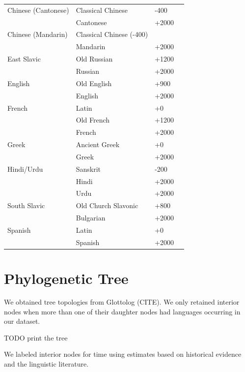 \documentclass[11pt,a4paper]{article}
\begin{document}
\begin{tabular}{llll} \hline
Chinese (Cantonese) & Classical Chinese & -400  \\
& Cantonese & +2000\\ \hline
Chinese (Mandarin) & Classical Chinese (-400)  \\
& Mandarin & +2000 \\ \hline
East Slavic & Old Russian & +1200 \\
& Russian & +2000 \\ \hline
English & Old English & +900 \\
& English  & +2000\\ \hline
French & Latin &+0  \\
& Old French &+1200\\
& French  & +2000\\ \hline
Greek & Ancient Greek & +0 \\
& Greek  & +2000\\ \hline
Hindi/Urdu & Sanskrit & -200 \\
& Hindi  & +2000\\
& Urdu  & +2000\\ \hline
South Slavic & Old Church Slavonic & +800 \\
& Bulgarian  & +2000\\ \hline
Spanish & Latin &+0 \\
& Spanish  & +2000\\ \hline
\end{tabular}

\section{Phylogenetic Tree}

We obtained tree topologies from Glottolog (CITE).
We only retained interior nodes when more than one of their daughter nodes had languages occurring in our dataset.

TODO print the tree

We labeled interior nodes for time using estimates based on historical evidence and the linguistic literature.
\end{document}

